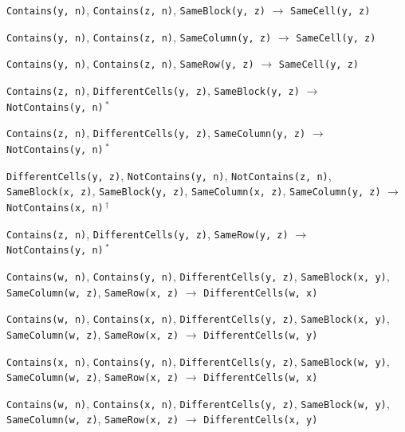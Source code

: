 \documentclass[11pt,a4paper]{article}
\theoremstyle{definition}
\theoremstyle{remark}
\begin{document}
{\small\raggedright
\begin{enumerate}[label={[\arabic*]},leftmargin=2.6em,itemsep=1pt]
  \item \texttt{Contains(y,~n)}, \allowbreak \texttt{Contains(z,~n)}, \allowbreak \texttt{SameBlock(y,~z)} \;$\to$\; \texttt{SameCell(y,~z)}
  \item \texttt{Contains(y,~n)}, \allowbreak \texttt{Contains(z,~n)}, \allowbreak \texttt{SameColumn(y,~z)} \;$\to$\; \texttt{SameCell(y,~z)}
  \item \texttt{Contains(y,~n)}, \allowbreak \texttt{Contains(z,~n)}, \allowbreak \texttt{SameRow(y,~z)} \;$\to$\; \texttt{SameCell(y,~z)}
  \item \texttt{Contains(z,~n)}, \allowbreak \texttt{DifferentCells(y,~z)}, \allowbreak \texttt{SameBlock(y,~z)} \;$\to$\; \texttt{NotContains(y,~n)}\,$^{\ast}$
  \item \texttt{Contains(z,~n)}, \allowbreak \texttt{DifferentCells(y,~z)}, \allowbreak \texttt{SameColumn(y,~z)} \;$\to$\; \texttt{NotContains(y,~n)}\,$^{\ast}$
  \item \texttt{DifferentCells(y,~z)}, \allowbreak \texttt{NotContains(y,~n)}, \allowbreak \texttt{NotContains(z,~n)}, \allowbreak \texttt{SameBlock(x,~z)}, \allowbreak \texttt{SameBlock(y,~z)}, \allowbreak \texttt{SameColumn(x,~z)}, \allowbreak \texttt{SameColumn(y,~z)} \;$\to$\; \texttt{NotContains(x,~n)}\,$^{\dagger}$
  \item \texttt{Contains(z,~n)}, \allowbreak \texttt{DifferentCells(y,~z)}, \allowbreak \texttt{SameRow(y,~z)} \;$\to$\; \texttt{NotContains(y,~n)}\,$^{\ast}$
  \item \texttt{Contains(w,~n)}, \allowbreak \texttt{Contains(y,~n)}, \allowbreak \texttt{DifferentCells(y,~z)}, \allowbreak \texttt{SameBlock(x,~y)}, \allowbreak \texttt{SameColumn(w,~z)}, \allowbreak \texttt{SameRow(x,~z)} \;$\to$\; \texttt{DifferentCells(w,~x)}
  \item \texttt{Contains(w,~n)}, \allowbreak \texttt{Contains(x,~n)}, \allowbreak \texttt{DifferentCells(y,~z)}, \allowbreak \texttt{SameBlock(x,~y)}, \allowbreak \texttt{SameColumn(w,~z)}, \allowbreak \texttt{SameRow(x,~z)} \;$\to$\; \texttt{DifferentCells(w,~y)}
  \item \texttt{Contains(x,~n)}, \allowbreak \texttt{Contains(y,~n)}, \allowbreak \texttt{DifferentCells(y,~z)}, \allowbreak \texttt{SameBlock(w,~y)}, \allowbreak \texttt{SameColumn(w,~z)}, \allowbreak \texttt{SameRow(x,~z)} \;$\to$\; \texttt{DifferentCells(w,~x)}
  \item \texttt{Contains(w,~n)}, \allowbreak \texttt{Contains(x,~n)}, \allowbreak \texttt{DifferentCells(y,~z)}, \allowbreak \texttt{SameBlock(w,~y)}, \allowbreak \texttt{SameColumn(w,~z)}, \allowbreak \texttt{SameRow(x,~z)} \;$\to$\; \texttt{DifferentCells(x,~y)}

\end{enumerate}}
\end{document}
